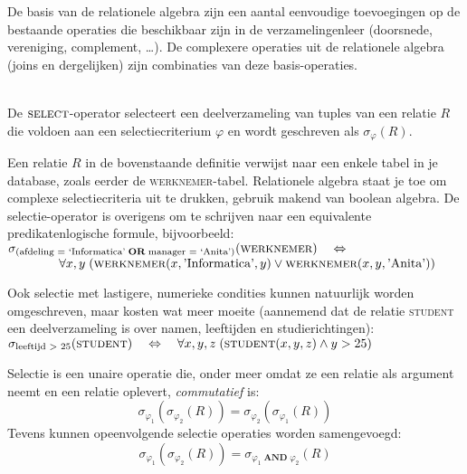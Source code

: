 \begin{aside}
De basis van de relationele algebra zijn een aantal eenvoudige toevoegingen op de bestaande operaties die beschikbaar zijn in de verzamelingenleer (doorsnede, vereniging, complement, \ldots). De complexere operaties uit de relationele algebra (joins en dergelijken) zijn combinaties van deze basis-operaties.

\begin{definition}[Selectie]\mbox{}\\
De $\mathsf{\textsc{select}}$-operator selecteert een deelverzameling van tuples van een relatie $R$ die voldoen aan een selectiecriterium $\varphi$ en wordt geschreven als $\sigma_\varphi(R)$.
\end{definition}
Een relatie $R$ in de bovenstaande definitie verwijst naar een enkele tabel in je database, zoals eerder de \textsc{werknemer}-tabel. Relationele algebra staat je toe om complexe selectiecriteria uit te drukken, gebruik makend van boolean algebra. De selectie-operator is overigens om te schrijven naar een equivalente predikatenlogische formule, bijvoorbeeld:\\[2.5pt]
$\sigma_{(\text{afdeling = `Informatica'}\;\mathbf{OR}\;\text{manager = `Anita'})}(\textsc{werknemer})\quad\Leftrightarrow$\\
$\mathtt{ }\qquad\qquad\forall x,y\;(\textsc{werknemer}(x,\text{'Informatica'},y)\vee\textsc{werknemer}(x,y,\text{'Anita'}))$

\noindent Ook selectie met lastigere, numerieke condities kunnen natuurlijk worden omgeschreven, maar kosten wat meer moeite (aannemend dat de relatie \textsc{student} een deelverzameling is over namen, leeftijden en studierichtingen):\\[2.5pt]
$\sigma_{\text{leeftijd > 25}}(\textsc{student})\quad\Leftrightarrow\quad\forall x,y,z\;(\textsc{student}(x, y, z) \wedge y > 25)$

Selectie is een unaire operatie die, onder meer omdat ze een relatie als argument neemt en een relatie oplevert, \textit{commutatief} is: $$\sigma_{\varphi_1}(\sigma_{\varphi_2}(R)) = \sigma_{\varphi_2}(\sigma_{\varphi_1}(R))$$ Tevens kunnen opeenvolgende selectie operaties worden samengevoegd: $$\sigma_{\varphi_1}(\sigma_{\varphi_2}(R)) = \sigma_{\varphi_1\;\mathbf{AND}\;\varphi_2}(R)$$


\end{aside}

